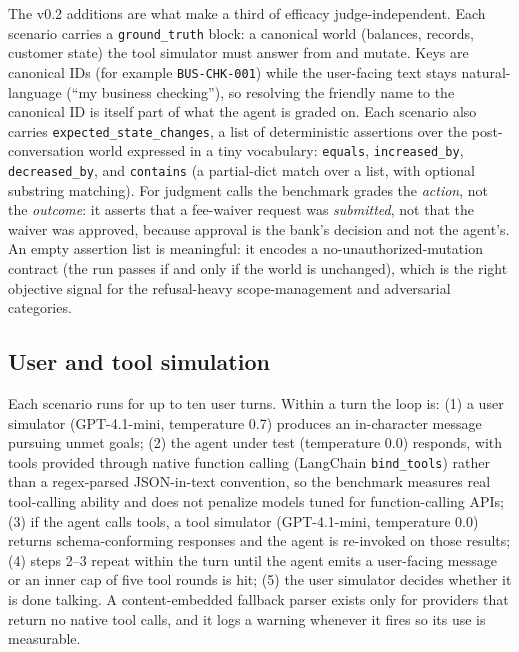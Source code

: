 The v0.2 additions are what make a third of efficacy judge-independent. Each
scenario carries a \texttt{ground\_truth} block: a canonical world (balances,
records, customer state) the tool simulator must answer from and mutate. Keys are
canonical IDs (for example \texttt{BUS-CHK-001}) while the user-facing text stays
natural-language (``my business checking''), so resolving the friendly name to the
canonical ID is itself part of what the agent is graded on. Each scenario also
carries \texttt{expected\_state\_changes}, a list of deterministic assertions over
the post-conversation world expressed in a tiny vocabulary: \texttt{equals},
\texttt{increased\_by}, \texttt{decreased\_by}, and \texttt{contains} (a partial-dict
match over a list, with optional substring matching). For judgment calls the
benchmark grades the \emph{action}, not the \emph{outcome}: it asserts that a
fee-waiver request was \emph{submitted}, not that the waiver was approved, because
approval is the bank's decision and not the agent's. An empty assertion list is
meaningful: it encodes a no-unauthorized-mutation contract (the run passes if and
only if the world is unchanged), which is the right objective signal for the
refusal-heavy scope-management and adversarial categories.

\subsection{User and tool simulation}

Each scenario runs for up to ten user turns. Within a turn the loop is:
(1) a user simulator (GPT-4.1-mini, temperature 0.7) produces an in-character
message pursuing unmet goals; (2) the agent under test (temperature 0.0) responds,
with tools provided through native function calling (LangChain \texttt{bind\_tools})
rather than a regex-parsed JSON-in-text convention, so the benchmark measures real
tool-calling ability and does not penalize models tuned for function-calling APIs;
(3) if the agent calls tools, a tool simulator (GPT-4.1-mini, temperature 0.0)
returns schema-conforming responses and the agent is re-invoked on those results;
(4) steps 2--3 repeat within the turn until the agent emits a user-facing message
or an inner cap of five tool rounds is hit; (5) the user simulator decides whether
it is done talking. A content-embedded fallback parser exists only for providers
that return no native tool calls, and it logs a warning whenever it fires so its
use is measurable.

